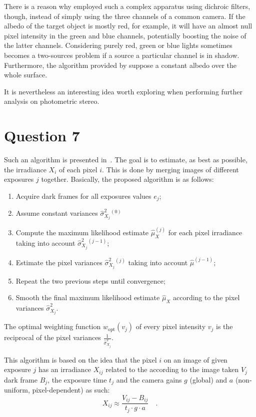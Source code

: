\documentclass{report}
\begin{document}
There is a reason why \cite{Fyffe2011} employed such a complex apparatus using dichroic filters, though, instead of simply using the three channels of a common camera. If the albedo of the target object is mostly red, for example, it will have an almost null pixel intensity in the green and blue channels, potentially boosting the noise of the latter channels.  Considering purely red, green or blue lights sometimes becomes a two-sources problem if a source a particular channel is in shadow. Furthermore, the algorithm provided by \cite{johnson-cvpr-11} suppose a constant albedo over the whole surface.

It is nevertheless an interesting idea worth exploring when performing further analysis on photometric stereo.

\section{Question 7}

Such an algorithm is presented in~\cite{Granados2010a}. The goal is to estimate, as best as possible, the irradiance $X_i$ of each pixel $i$. This is done by merging images of different exposures $j$ together. Basically, the proposed algorithm is as follows:
\begin{enumerate}
  \item{Acquire dark frames for all exposures values $e_j$;}
  \item{Assume constant variances $\hat{\sigma}_{X_j}^2{}^{(0)}$}
  \item{Compute the maximum likelihood estimate $\hat{\mu}_X^{(j)}$ for each pixel irradiance taking into account $\hat{\sigma}_{X_j}^2{}^{(j-1)}$;}
  \item{Estimate the pixel variances $\hat{\sigma}_{X_j}^2{}^{(j)}$ taking into account $\hat{\mu}^{(j-1)}$;}
  \item{Repeat the two previous steps until convergence;}
  \item{Smooth the final maximum likelihood estimate $\hat{\mu}_X$ according to the pixel variances $\hat{\sigma}_{X_j}^2$}.
\end{enumerate}

The optimal weighting function $w_{\mathrm{opt}}\left(v_j\right)$ of every pixel intensity $v_j$ is the reciprocal of the pixel variances $\frac{1}{\hat{\sigma}_{X_j}^2}$.

This algorithm is based on the idea that the pixel $i$ on an image of given exposure $j$ has an irradiance $X_{ij}$ related to the according to the image taken $V_j$ dark frame $B_j$, the exposure time $t_j$ and the camera gains $g$ (global) and $a$ (non-uniform, pixel-dependent) as such:
\begin{equation}
\label{q7:eqirr}
X_{ij} \approx \frac{V_{ij} - B_{ij}}{t_j \cdot g \cdot a}
\quad.
\end{equation}
\end{document}

